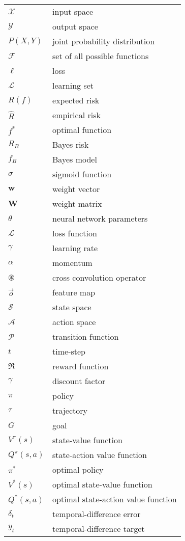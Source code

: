 \begin{tabularx}{\textwidth}{ l X }

 $\mathcal{X}$ & input space \\
 $\mathcal{Y}$ & output space \\
 $P(X,Y)$ & joint probability distribution \\ 
 $\mathcal{F}$ & set of all possible functions \\ 
 $\ell$ & loss \\
 $\mathcal{L}$ & learning set \\ 
 $R(f)$ & expected risk \\ 
 $\hat{R}$ & empirical risk \\ 
 $f^{*}$ & optimal function \\ 
 $R_B$ & Bayes risk \\ 
 $f_B$ & Bayes model \\ 
 $\sigma$ & sigmoid function \\ 
 $\mathbf{w}$ & weight vector \\ 
 $\mathbf{W}$ & weight matrix \\ 
 $\theta$ & neural network parameters \\ 
 $\mathscr{L}$ & loss function \\ 
 $\gamma$ & learning rate \\  
 $\alpha$ & momentum \\ 
 $\circledast$ & cross convolution operator \\ 
 $\vec{o}$ & feature map \\
$\mathcal{S}$ & state space \\ 
$\mathcal{A}$ & action space \\
$\mathcal{P}$ & transition function \\ 
$t$ & time-step \\
$\Re$ & reward function \\ 
$\gamma$ & discount factor \\ 
$\pi$ & policy \\ 
$\tau$ & trajectory \\ 
$G$ & goal \\ 
$V^{\pi}(s)$ & state-value function \\
$Q^{\pi}(s,a)$ & state-action value function \\ 
$\pi^{*}$ & optimal policy \\ 
$V^{*}(s)$ & optimal state-value function \\
$Q^{*}(s,a)$ & optimal state-action value function \\
$\delta_t$ & temporal-difference error \\ 
$y_t$ & temporal-difference target \\ 


\end{tabularx}


\endgroup
